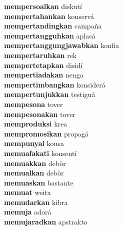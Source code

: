 \textbf{mempersoalkan } diskutí \\
\textbf{mempertahankan } konservá \\
\textbf{mempertandingkan } campaña \\
\textbf{mempertangguhkan } aplasá \\
\textbf{mempertanggungjawabkan } konfia \\
\textbf{mempertaruhkan } rek \\
\textbf{mempertetapkan } disidí \\
\textbf{mempertiadakan } nenga \\
\textbf{mempertimbangkan } konsiderá \\
\textbf{mempertunjukkan } testiguá \\
\textbf{mempesona } tover \\
\textbf{mempesonakan } tover \\
\textbf{memproduksi } krea \\
\textbf{mempromosikan } propagá \\
\textbf{mempunyai } kousa \\
\textbf{memuafakati } konsentí \\
\textbf{memuakkan } debòr \\
\textbf{memualkan } debòr \\
\textbf{memuaskan } bastante \\
\textbf{memuat } weita \\
\textbf{memudarkan } kibra \\
\textbf{memuja } adorá \\
\textbf{memujaradkan } apstrakto \\
